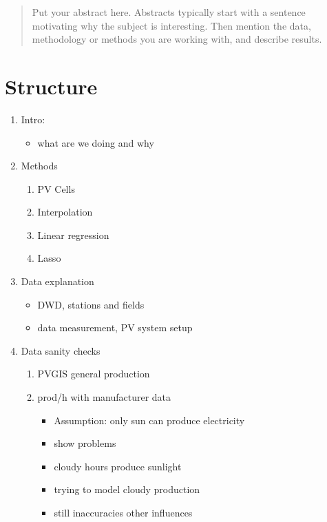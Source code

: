 \documentclass{article}
\begin{document}
\printAffiliationsAndNotice{\icmlEqualContribution} %

\begin{abstract}
Put your abstract here. Abstracts typically start with a sentence motivating why the subject is interesting. Then mention the data, methodology or methods you are working with, and describe results. 
\end{abstract}

\section*{Structure}
\begin{enumerate}
	\item Intro: \begin{itemize}
		\item what are we doing and why
	\end{itemize}
	\item Methods\begin{enumerate}
		\item PV Cells 
		\item Interpolation
		\item Linear regression
		\item Lasso
	\end{enumerate}
	\item Data explanation \begin{itemize}
		\item DWD, stations and fields
		\item data measurement, PV system setup
	\end{itemize}
	\item Data sanity checks\begin{enumerate}
		\item PVGIS general production
		\item prod/h with manufacturer data\begin{itemize}
			\item Assumption: only sun can produce electricity
			\item show problems
			\item cloudy hours produce sunlight
			\item trying to model cloudy production
			\item still inaccuracies other influences
		\end{itemize}
	\end{enumerate}

\end{enumerate}
\end{document}
